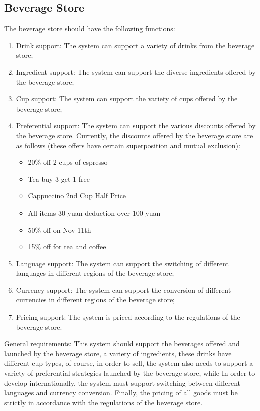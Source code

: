 \documentclass[a4paper]{report}
\begin{document}
\subsection{Beverage Store}
The beverage store should have the following functions:
\begin{enumerate}
\item
Drink support: The system can support a variety of drinks from the beverage store;
\item Ingredient support: The system can support the diverse ingredients offered by the beverage store;
\item
Cup support: The system can support the variety of cups offered by the beverage store;
\item 
Preferential support: The system can support the various discounts offered by the beverage store. Currently, the discounts offered by the beverage store are as follows (these offers have certain superposition and mutual exclusion):
\begin{itemize}
\item
20\% off 2 cups of espresso
\item 
Tea buy 3 get 1 free
\item
Cappuccino 2nd Cup Half Price
\item
All items 30 yuan deduction over 100 yuan
\item 50\% off on Nov 11th
\item
15\% off for tea and coffee
\end{itemize}
\item Language support: The system can support the switching of different languages in different regions of the beverage store;
\item
Currency support: The system can support the conversion of different currencies in different regions of the beverage store;
\item
Pricing support: The system is priced according to the regulations of the beverage store.
\end{enumerate}
\par
General requirements: This system should support the beverages offered and launched by the beverage store, a variety of ingredients, these drinks have different cup types, of course, in order to sell, the system also needs to support a variety of preferential strategies launched by the beverage store, while In order to develop internationally, the system must support switching between different languages and currency conversion. Finally, the pricing of all goods must be strictly in accordance with the regulations of the beverage store.
\end{document}
